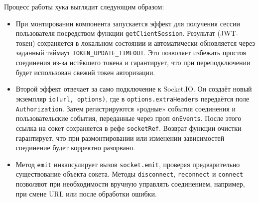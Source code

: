 Процесс работы хука выглядит следующим образом:
\begin{itemize}
  \item При монтировании компонента запускается эффект для получения сессии пользователя посредством функции \texttt{getClientSession}. Результат (JWT-токен) сохраняется в локальном состоянии и автоматически обновляется через заданный таймаут \texttt{TOKEN\_UPDATE\_TIMEOUT}. Это позволяет избежать простоя соединения из-за истёкшего токена и гарантирует, что при переподключении будет использован свежий токен авторизации.
  \item Второй эффект отвечает за само подключение к Socket.IO. Он создаёт новый экземпляр \texttt{io(url, options)}, где в \texttt{options.extraHeaders} передаётся поле \texttt{Authorization}. Затем регистрируются «родные» события соединения и пользовательские события, переданные через проп \texttt{onEvents}. После этого ссылка на сокет сохраняется в рефе \texttt{socketRef}. Возврат функции очистки гарантирует, что при размонтировании или изменении зависимостей соединение будет корректно разорвано.
  \item Метод \texttt{emit} инкапсулирует вызов \texttt{socket.emit}, проверяя предварительно существование объекта сокета. Методы \texttt{disconnect}, \texttt{reconnect} и \texttt{connect} позволяют при необходимости вручную управлять соединением, например, при смене URL или после обработки ошибки.
\end{itemize}

